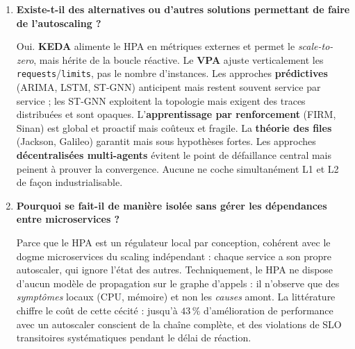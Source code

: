 \documentclass[11pt,a4paper]{article}
\begin{document}
\begin{enumerate}[label=\textbf{Q\arabic*.}, leftmargin=*, itemsep=0.6em]
Parce que le HPA est conçu comme un régulateur réactif et local : un point de consigne stable est nécessaire à la stabilité d'une boucle de rétroaction, et la tolérance de \( \pm 10\,\% \) est un garde-fou anti-oscillation. Trois conséquences en découlent : inadéquation aux charges hétérogènes, dépendance à la valeur des \texttt{requests} (le seuil s'exprime en pourcentage des \texttt{requests}, pas de la consommation réelle, si bien qu'abaisser une \texttt{request} fait artificiellement exploser l'utilisation affichée), et réactivité structurellement tardive (délai de \(90\) à \(150\) secondes avec \emph{cold start}). Les évolutions récentes (v2, champ \texttt{behavior}, tolérance configurable en v1.33 alpha) permettent de \emph{régler} le seuil mais non de le rendre dynamique en fonction de la charge future ou des dépendances.

\item \textbf{Existe-t-il des alternatives ou d'autres solutions permettant de faire de l'autoscaling ?}

Oui. \textbf{KEDA} alimente le HPA en métriques externes et permet le \emph{scale-to-zero}, mais hérite de la boucle réactive. Le \textbf{VPA} ajuste verticalement les \texttt{requests}/\texttt{limits}, pas le nombre d'instances. Les approches \textbf{prédictives} (ARIMA, LSTM, ST-GNN) anticipent mais restent souvent service par service ; les ST-GNN exploitent la topologie mais exigent des traces distribuées et sont opaques. L'\textbf{apprentissage par renforcement} (FIRM, Sinan) est global et proactif mais coûteux et fragile. La \textbf{théorie des files} (Jackson, Galileo) garantit mais sous hypothèses fortes. Les approches \textbf{décentralisées multi-agents} évitent le point de défaillance central mais peinent à prouver la convergence. Aucune ne coche simultanément L1 et L2 de façon industrialisable.

\item \textbf{Pourquoi se fait-il de manière isolée sans gérer les dépendances entre microservices ?}

Parce que le HPA est un régulateur local par conception, cohérent avec le dogme microservices du scaling indépendant : chaque service a son propre autoscaler, qui ignore l'état des autres. Techniquement, le HPA ne dispose d'aucun modèle de propagation sur le graphe d'appels : il n'observe que des \emph{symptômes} locaux (CPU, mémoire) et non les \emph{causes} amont. La littérature chiffre le coût de cette cécité : jusqu'à \(43\,\%\) d'amélioration de performance avec un autoscaler conscient de la chaîne complète, et des violations de SLO transitoires systématiques pendant le délai de réaction.


\end{enumerate}
\end{document}
